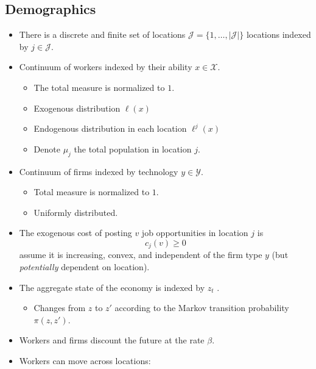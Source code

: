 \documentclass[
  letterpaper,
  DIV=11,
  numbers=noendperiod]{scrreprt}
\providecommand{\tightlist}{%
  \setlength{\itemsep}{0pt}\setlength{\parskip}{0pt}}\usepackage{longtable,booktabs,array}
\begin{document}
\hypertarget{demographics}{%
\subsection{Demographics}\label{demographics}}

\begin{itemize}
\tightlist
\item
  There is a discrete and finite set of locations
  \(\mathcal{J}=\{1,\dots,|\mathcal{J}|\}\) locations indexed by
  \(j\in\mathcal{J}\).
\item
  Continuum of workers indexed by their ability \(x\in \mathcal{X}\).

  \begin{itemize}
  \tightlist
  \item
    The total measure is normalized to \(1\).
  \item
    Exogenous distribution \(\ell(x)\)
  \item
    Endogenous distribution in each location \(\ell^{j}(x)\)
  \item
    Denote \(\mu_j\) the total population in location \(j\).
  \end{itemize}
\item
  Continuum of firms indexed by technology \(y\in \mathcal{Y}\).

  \begin{itemize}
  \tightlist
  \item
    Total measure is normalized to \(1\).
  \item
    Uniformly distributed.
  \end{itemize}
\item
  The exogenous cost of posting \(v\) job opportunities in location
  \(j\) is \[c_{j}(v)\geq0\] assume it is increasing, convex, and
  independent of the firm type \(y\) (but \emph{potentially} dependent
  on location).
\item
  The aggregate state of the economy is indexed by \(z_t\) .

  \begin{itemize}
  \tightlist
  \item
    Changes from \(z\) to \(z'\) according to the Markov transition
    probability \(\pi(z, z')\).
  \end{itemize}
\item
  Workers and firms discount the future at the rate \(\beta\).
\item
  Workers can move across locations:


\end{itemize}
\end{document}
